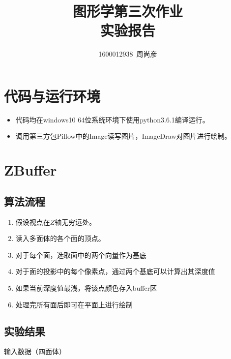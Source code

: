 \documentclass[11pt,UTF8]{article}
\title{\fontsize{25pt}{\baselineskip}\textbf{图形学第三次作业\\[2ex]实验报告}}
\author{1600012938~周尚彦}
\begin{document}
\thispagestyle{plain}

\maketitle

\tableofcontents

\setcounter{section}{0}

\section{代码与运行环境}
	\begin{itemize}
		\item 代码均在windows10 64位系统环境下使用python3.6.1编译运行。
		\item 调用第三方包Pillow中的Image读写图片，ImageDraw对图片进行绘制。
	\end{itemize}
\newpage

\section{ZBuffer}
\subsection{算法流程}
	\begin{enumerate}
		\item 假设视点在$Z$轴无穷远处。
		\item 读入多面体的各个面的顶点。
		\item 对于每个面，选取面中的两个向量作为基底
		\item 对于面的投影中的每个像素点，通过两个基底可以计算出其深度值
		\item 如果当前深度值最浅，将该点颜色存入buffer区
		\item 处理完所有面后即可在平面上进行绘制
	\end{enumerate}

\subsection{实验结果}
	输入数据（四面体）
\end{document}
